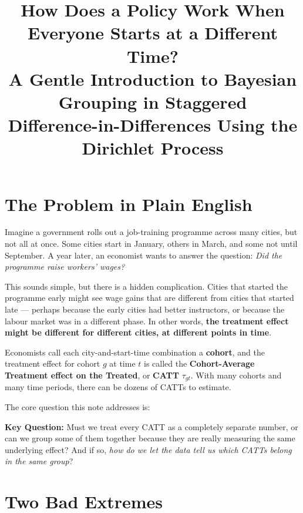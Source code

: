 \documentclass[12pt]{article}
\title{\textbf{How Does a Policy Work When Everyone Starts at a Different Time?}\\[6pt]
\large A Gentle Introduction to Bayesian Grouping in Staggered\\
Difference-in-Differences Using the Dirichlet Process}
\author{}
\date{}
\begin{document}
\maketitle
\tableofcontents
\newpage

\section{The Problem in Plain English}

Imagine a government rolls out a job-training programme across many cities, but
not all at once. Some cities start in January, others in March, and some not
until September. A year later, an economist wants to answer the question:
\textit{Did the programme raise workers' wages?}

This sounds simple, but there is a hidden complication. Cities that started the
programme early might see wage gains that are different from cities that started
late --- perhaps because the early cities had better instructors, or because the
labour market was in a different phase. In other words, \textbf{the treatment
effect might be different for different cities, at different points in time}.

Economists call each city-and-start-time combination a \textbf{cohort}, and the
treatment effect for cohort $g$ at time $t$ is called the
\textbf{Cohort-Average Treatment effect on the Treated}, or \textbf{CATT}
$\tau_{gt}$. With many cohorts and many time periods, there can be dozens of
CATTs to estimate.

The core question this note addresses is:

\begin{conceptbox}
\textbf{Key Question:} Must we treat every CATT as a completely separate number,
or can we group some of them together because they are really measuring the same
underlying effect? And if so, \textit{how do we let the data tell us which
CATTs belong in the same group}?
\end{conceptbox}

\section{Two Bad Extremes}
\end{document}
